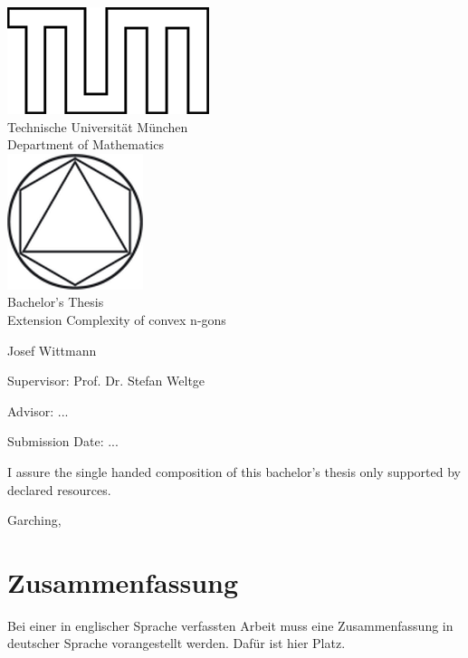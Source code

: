 \documentclass[12pt,a4paper,twoside]{article}
\begin{document}
\pagestyle{empty}
\begin{titlepage}
\begin{center}
\includegraphics{assets/TUMlschwarz.png}\\[3mm]
\sf
{\Large
  Technische Universit\"at M\"unchen\\[5mm]
  Department of Mathematics\\[8mm]
}
\normalsize
\includegraphics{assets/TUMlMschwarz.png}\\[15mm]

Bachelor's Thesis\\[15mm]

{\Huge
  Extension Complexity of convex n-gons
}
\bigskip

\normalsize

Josef Wittmann
\end{center}
\vspace*{75mm}

Supervisor: Prof. Dr. Stefan Weltge
\medskip

Advisor: ...
\medskip

Submission Date: ...

\end{titlepage}

\vspace*{150mm}

I assure the single handed composition of this bachelor's thesis only supported by declared resources.
\bigskip

Garching, 
\newpage
\section*{Zusammenfassung}
Bei einer in englischer Sprache verfassten Arbeit muss eine Zusammenfassung in deutscher Sprache vorangestellt werden.
Daf\"ur ist hier Platz.
\end{document}
